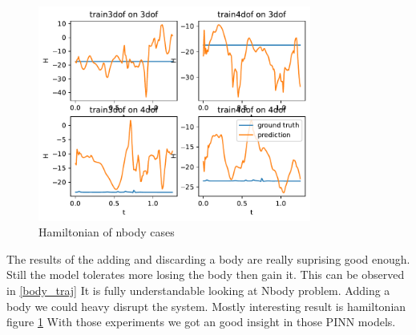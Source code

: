 \begin{figure}[htbp]
	\centering
	\includegraphics[width=0.8\textwidth]{chapters/chapter5/nbody_hamiltonian.pdf} %
	\caption{Hamiltonian of nbody cases}
	\label{nbody_ham}
\end{figure}

The results of the adding and discarding a body are really suprising good enough. Still the model tolerates more losing the body then gain it. This can be observed in \ref{body_traj} It is fully understandable looking at Nbody problem. Adding a body we could heavy disrupt the system.
Mostly interesting result is hamiltonian figure \ref{nbody_ham}
With those experiments we got an good insight in those PINN models.